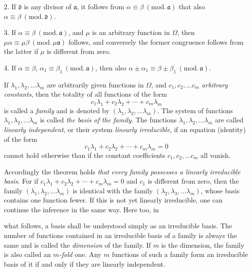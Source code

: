 \documentclass{article}
\begin{document}
2. If $\mathfrak{d}$ is any divisor of $\mathfrak{a}$, it follows from $\alpha \equiv \beta \ (\text{mod.}\,\mathfrak{a})$ that also $\alpha \equiv \beta \ (\text{mod.}\,\mathfrak{d})$.

3. If $\alpha \equiv \beta \ (\text{mod.}\,\mathfrak{a})$, and $\mu$ is an arbitrary function in $\Omega$, then $\mu\alpha \equiv \mu\beta \ (\text{mod.}\,\mu\mathfrak{a})$ follows, and conversely the former congruence follows from the latter if $\mu$ is different from zero.

4. If $\alpha \equiv \beta$, $\alpha_{1} \equiv \beta_{1} \ (\text{mod.}\,\mathfrak{a})$, then also $\alpha \pm \alpha_{1} \equiv \beta \pm \beta_{1} \ (\text{mod.}\,\mathfrak{a})$.

If $\lambda_{1}, \lambda_{2}, \ldots \lambda_{m}$ are arbitrarily given functions in $\Omega$, and $c_{1}, c_{2}, \ldots c_{m}$ \emph{arbitrary constants}, then the totality of all functions of the form
\[ c_{1}\lambda_{1} + c_{2}\lambda_{2} + \cdots + c_{m}\lambda_{m} \]
is called a \emph{family} and is denoted by $(\lambda_{1}, \lambda_{2}, \ldots \lambda_{m})$. The system of functions $\lambda_{1}, \lambda_{2}, \ldots \lambda_{m}$ is called \emph{the basis of the family}. The functions $\lambda_{1}, \lambda_{2}, \ldots \lambda_{m}$ are called \emph{linearly independent}, or their system \emph{linearly irreducible}, if an equation (identity) of the form
\[ c_{1}\lambda_{1} + c_{2}\lambda_{2} + \cdots + c_{m}\lambda_{m} = 0 \]
cannot hold otherwise than if the constant coefficients $c_{1}, c_{2}, \ldots c_{m}$ all vanish.

Accordingly the theorem holds \emph{that every family possesses a linearly irreducible basis}. For if $c_{1}\lambda_{1} + c_{2}\lambda_{2} + \cdots + c_{m}\lambda_{m} = 0$ and $c_{1}$ is different from zero, then the family $(\lambda_{1}, \lambda_{2}, \ldots \lambda_{m})$ is identical with the family $(\lambda_{2}, \lambda_{3}, \ldots \lambda_{m})$, whose basis contains one function fewer. If this is not yet linearly irreducible, one can continue the inference in the same way. Here too, in

what follows, a basis shall be understood simply as an irreducible basis. The number of functions contained in an irreducible basis of a family is always the same and is called the \emph{dimension} of the family. If $m$ is the dimension, the family is also called an \emph{$m$-fold} one. Any $m$ functions of such a family form an irreducible basis of it if and only if they are linearly independent.
\end{document}
